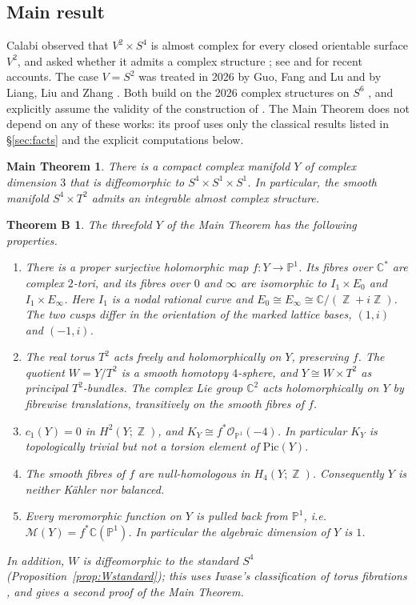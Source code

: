 \documentclass{article}
\DeclareMathOperator{\Z}{\mathbb{Z}}
\newtheorem*{maintheorem}{Main Theorem}
\newtheorem*{theoremB}{Theorem B}
\theoremstyle{definition}
\theoremstyle{plain}
\newcommand{\C}{\mathbb{C}}
\newcommand{\PP}{\mathbb{P}}
\newcommand{\cO}{\mathcal{O}}
\begin{document}
\subsection{Main result}
Calabi observed that $V^2\times S^4$ is almost complex for every closed orientable
surface $V^2$, and asked whether it admits a complex structure \cite{Calabi58}; see
\cite[\S1]{GFL26} and \cite{EuhSekigawa13} for recent accounts. The case $V=S^2$
was treated in 2026 by Guo, Fang and Lu \cite{GFL26} and by Liang, Liu and Zhang
\cite{LLZ26}. Both build on the 2026 complex structures on $S^6$
\cite{AC26,Engel26}, and \cite{LLZ26} explicitly assume the validity of the
construction of \cite{AC26}. The Main Theorem does not depend on any of these works:
its proof uses only the classical results listed in \S\ref{sec:facts} and the explicit
computations below.

\begin{maintheorem}
There is a compact complex manifold $Y$ of complex dimension $3$ that is diffeomorphic
to $S^4\times S^1\times S^1$. In particular, the smooth manifold $S^4\times T^2$
admits an integrable almost complex structure.
\end{maintheorem}

\begin{theoremB}
The threefold $Y$ of the Main Theorem has the following properties.
\begin{enumerate}
\item There is a proper surjective holomorphic map $f\colon Y\to\PP^1$. Its fibres
  over $\C^*$ are complex $2$-tori, and its fibres over $0$ and $\infty$ are
  isomorphic to $I_1\times E_0$ and $I_1\times E_\infty$. Here $I_1$ is a nodal
  rational curve and $E_0\cong E_\infty\cong\C/(\Z+i\Z)$. The two cusps differ in the
orientation of the marked lattice bases, $(1,i)$ and $(-1,i)$.
\item The real torus $T^2$ acts freely and holomorphically on $Y$, preserving $f$.
  The quotient $W=Y/T^2$ is a smooth homotopy $4$-sphere, and $Y\cong W\times T^2$
  as principal $T^2$-bundles. The complex Lie group $\C^2$ acts holomorphically on
  $Y$ by fibrewise translations, transitively on the smooth fibres of $f$.
\item $c_1(Y)=0$ in $H^2(Y;\Z)$, and $K_Y\cong f^*\cO_{\PP^1}(-4)$. In particular $K_Y$
  is topologically trivial but not a torsion element of $\mathrm{Pic}(Y)$.
\item The smooth fibres of $f$ are null-homologous in $H_4(Y;\Z)$. Consequently $Y$ is
  neither K\"ahler nor balanced.
\item Every meromorphic function on $Y$ is pulled back from $\PP^1$, i.e.\
  $\mathcal M(Y)=f^*\C(\PP^1)$. In particular the algebraic dimension of $Y$ is $1$.
\end{enumerate}
In addition, $W$ is diffeomorphic to the standard $S^4$
(Proposition~\ref{prop:Wstandard}); this uses Iwase's classification of torus
fibrations \cite{Iwase84}, and gives a second proof of the Main Theorem.
\end{theoremB}
\end{document}
